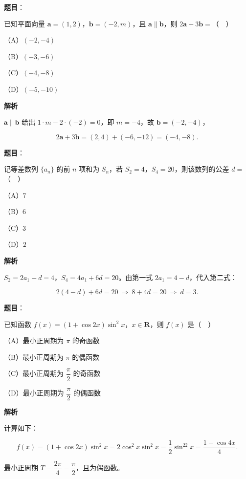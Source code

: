 \begin{answer}

\textbf{题目}：

已知平面向量 $\boldsymbol a=(1,2)$，$\boldsymbol b=(-2,m)$，且 $\boldsymbol a\parallel\boldsymbol b$，则 $2\boldsymbol a+3\boldsymbol b=$（　）

（A）$(-2,-4)$

（B）$(-3,-6)$

（C）$(-4,-8)$

（D）$(-5,-10)$

\textbf{解析}

$\boldsymbol a\parallel\boldsymbol b$ 给出 $1\cdot m-2\cdot(-2)=0$，即 $m=-4$，故 $\boldsymbol b=(-2,-4)$，

\nopagebreak[4]
\[2\boldsymbol a+3\boldsymbol b=(2,4)+(-6,-12)=(-4,-8).\]


\end{answer}
\begin{answer}

\textbf{题目}：

记等差数列 $\{a_n\}$ 的前 $n$ 项和为 $S_n$，若 $S_2=4$，$S_4=20$，则该数列的公差 $d=$（　）

（A）$7$

（B）$6$

（C）$3$

（D）$2$

\textbf{解析}

$S_2=2a_1+d=4$，$S_4=4a_1+6d=20$。由第一式 $2a_1=4-d$，代入第二式：

\nopagebreak[4]
\[2(4-d)+6d=20\ \Longrightarrow\ 8+4d=20\ \Longrightarrow\ d=3.\]


\end{answer}
\begin{answer}

\textbf{题目}：

已知函数 $f(x)=(1+\cos2x)\sin^2x$，$x\in\mathbf R$，则 $f(x)$ 是（　）

（A）最小正周期为 $\pi$ 的奇函数

（B）最小正周期为 $\pi$ 的偶函数

（C）最小正周期为 $\dfrac{\pi}{2}$ 的奇函数

（D）最小正周期为 $\dfrac{\pi}{2}$ 的偶函数

\textbf{解析}

计算如下：

\nopagebreak[4]
\[f(x)=(1+\cos2x)\sin^2x=2\cos^2x\sin^2x=\frac12\sin^22x=\frac{1-\cos4x}4.\]

最小正周期 $T=\dfrac{2\pi}4=\dfrac{\pi}{2}$，且为偶函数。


\end{answer}
